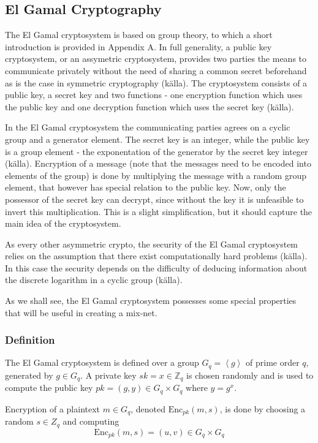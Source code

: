 \subsection{El Gamal Cryptography}

The El Gamal cryptosystem is based on group theory, to which a short
introduction is provided in Appendix A. In full generality, a public
key cryptosystem, or an assymetric cryptosystem, provides two parties
the means to communicate privately without the need of sharing a
common secret beforehand as is the case in symmetric cryptography
(källa). The cryptosystem consists of a public key, a secret key and
two functions - one encryption function which uses the public key and
one decryption function which uses the secret key (källa).

In the El Gamal cryptosystem the communicating parties agrees on a
cyclic group and a generator element. The secret key is an integer,
while the public key is a group element - the exponentation of the
generator by the secret key integer (källa). Encryption of a message
(note that the messages need to be encoded into elements of the group)
is done by multiplying the message with a random group element, that
however has special relation to the public key. Now, only the
possessor of the secret key can decrypt, since without the key it is
unfeasible to invert this multiplication. This is a slight
simplification, but it should capture the main idea of the
cryptosystem.

As every other asymmetric crypto, the security of the El Gamal
cryptosystem relies on the assumption that there exist computationally
hard problems (källa). In this case the security depends on the
difficulty of deducing information about the discrete logarithm in a
cyclic group (källa).

As we shall see, the El Gamal cryptosystem possesses some special
properties that will be useful in creating a mix-net.

\subsubsection{Definition}
The El Gamal cryptosystem is defined over a group $G_q =
\left<g\right>$ of prime order $q$, generated by $g \in G_q$. A
private key $sk = x \in \mathbb{Z}_q$ is chosen randomly and is used
to compute the public key $pk = (g,y) \in G_q \times G_q$ where $y =
g^x$.

Encryption of a plaintext $m \in G_q$, denoted
$\mathrm{Enc}_{pk}(m,s)$, is done by choosing a random $s \in Z_q$ and
computing 
$$
\mathrm{Enc}_{pk}(m,s) = (u,v) \in G_q \times G_q
$$

